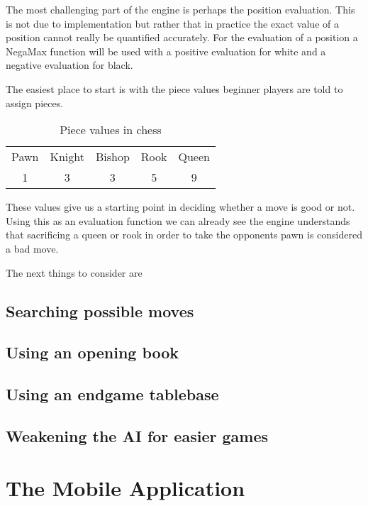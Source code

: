\documentclass[11pt]{report}
\begin{document}
The most challenging part of the engine is perhaps the position evaluation. This is not due to implementation but rather that in practice the exact value of a position cannot really be quantified accurately. For the evaluation of a position a NegaMax function will be used with a positive evaluation for white and a negative evaluation for black.\newline


The easiest place to start is with the piece values beginner players are told to assign pieces.

\begin{table}[h]
\centering
\begin{tabular}{ccccc}
Pawn & Knight & Bishop & Rook & Queen \\
1    & 3      & 3      & 5    & 9    
\end{tabular}
\caption{Piece values in chess}
\end{table}

These values give us a starting point in deciding whether a move is good or not. Using this as an evaluation function we can already see the engine understands that sacrificing a queen or rook in order to take the opponents pawn is considered a bad move.\newline

The next things to consider are 

\section{Searching possible moves}

\section{Using an opening book}

\section{Using an endgame tablebase}

\section{Weakening the AI for easier games}


\chapter{The Mobile Application}
\end{document}
